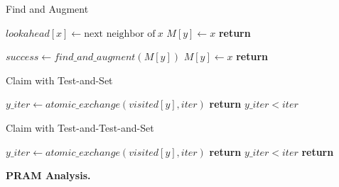 \documentclass[letterpaper]{article}
\newcommand{\mypar}[1]{{\bf #1.}}
\begin{document}
\begin{algorithm}
    \caption{Find and Augment}
    \label{alg:fa}
    \begin{algorithmic}[1]


                \State $lookahead[x] \gets \text{next neighbor of}\ x$
                        \State $M[y] \gets x$ 
                        \State \textbf{return} \True
                    \EndIf
                \EndIf
            \EndFor
            
                    \State $success \gets find\_and\_augment(M[y])$
                        \State $M[y] \gets x$ 
                        \State \textbf{return} \True
                    \EndIf
                \EndIf
            \EndFor
        \EndProcedure
    \end{algorithmic}
\end{algorithm}

\begin{algorithm}
    \caption{Claim with Test-and-Set}
    \label{alg:claim_tas}
    \begin{algorithmic}[1]
            \State $y\_iter \gets atomic\_exchange(visited[y], iter)$
            \State \textbf{return} $y\_iter < iter$
        \EndProcedure
    \end{algorithmic}
\end{algorithm}


\begin{algorithm}
    \caption{Claim with Test-and-Test-and-Set}
    \label{alg:claim_ttas}
    \begin{algorithmic}[1]
                \State $y\_iter \gets atomic\_exchange(visited[y], iter)$
                \State \textbf{return} $y\_iter < iter$
            \EndIf
            \State \textbf{return} \False
        \EndProcedure
    \end{algorithmic}
\end{algorithm}

\mypar{PRAM Analysis}
\end{document}

